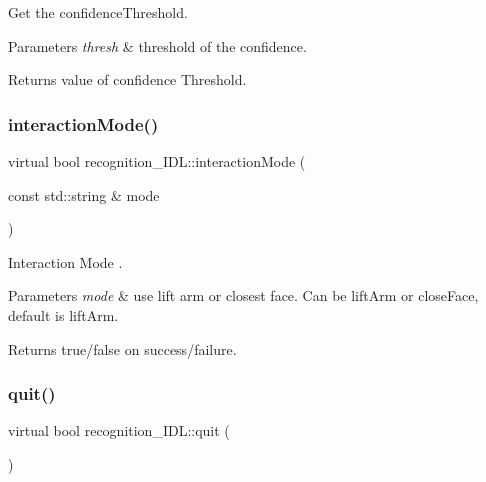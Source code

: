 Get the confidence\+Threshold. 


\begin{DoxyParams}{Parameters}
{\em thresh} & threshold of the confidence. \\
\hline
\end{DoxyParams}
\begin{DoxyReturn}{Returns}
value of confidence Threshold. 
\end{DoxyReturn}
\mbox{\label{classrecognition__IDL_afb70498b2cf99712cfad0e19d171dcab}} 
\subsubsection{\texorpdfstring{interactionMode()}{interactionMode()}}
{\footnotesize\ttfamily virtual bool recognition\+\_\+\+I\+D\+L\+::interaction\+Mode (\begin{DoxyParamCaption}\item[{const std\+::string \&}]{mode }\end{DoxyParamCaption})\hspace{0.3cm}{\ttfamily [virtual]}}



Interaction Mode . 


\begin{DoxyParams}{Parameters}
{\em mode} & use lift arm or closest face. Can be lift\+Arm or close\+Face, default is lift\+Arm. \\
\hline
\end{DoxyParams}
\begin{DoxyReturn}{Returns}
true/false on success/failure. 
\end{DoxyReturn}
\mbox{\label{classrecognition__IDL_a42d5f63c8461c081cf2c17311bed5375}} 
\subsubsection{\texorpdfstring{quit()}{quit()}}
{\footnotesize\ttfamily virtual bool recognition\+\_\+\+I\+D\+L\+::quit (\begin{DoxyParamCaption}{ }\end{DoxyParamCaption})\hspace{0.3cm}{\ttfamily [virtual]}}



